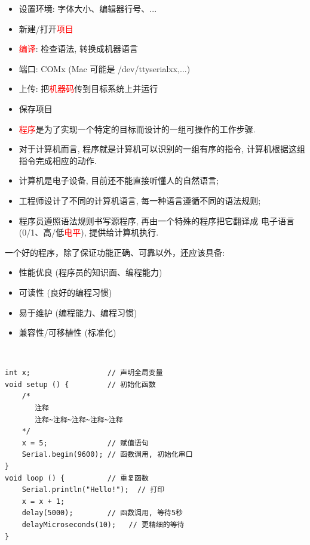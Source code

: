 \documentclass[a4paper,11pt]{seminar}
\newcommand{\alert}[1]{\textcolor{red}{#1}}
\begin{document}
\begin{itemize}
    \item 设置环境: 字体大小、编辑器行号、...
    \item 新建/打开\alert{项目}
    \item \alert{编译}: 检查语法, 转换成机器语言
    \item 端口: COMx (Mac 可能是  /dev/ttyserialxx,...)
    \item 上传: 把\alert{机器码}传到目标系统上并运行
    \item 保存项目
\end{itemize}
\endslide

\begin{itemize}
    \item \alert{程序}是为了实现一个特定的目标而设计的一组可操作的工作步骤.
    \item 对于计算机而言, 程序就是计算机可以识别的一组有序的指令, 
        计算机根据这组指令完成相应的动作.
    \item 计算机是电子设备, 目前还不能直接听懂人的自然语言;
    \item 工程师设计了不同的计算机语言, 每一种语言遵循不同的语法规则;
    \item 程序员遵照语法规则书写源程序, 再由一个特殊的程序把它翻译成
        电子语言 (0/1、高/低\alert{电平}), 提供给计算机执行.
\end{itemize}
\endslide

一个好的程序，除了保证功能正确、可靠以外，还应该具备:
\begin{itemize}
    \item 性能优良 (程序员的知识面、编程能力)
    \item 可读性  (良好的编程习惯)
    \item 易于维护 (编程能力、编程习惯)
    \item 兼容性/可移植性 (标准化)
\end{itemize}
\endslide


~\ \vskip-6mm
\begin{lstlisting}
int x;                  // 声明全局变量
void setup () {         // 初始化函数
    /*
       注释
       注释~注释~注释~注释~注释
    */
    x = 5;              // 赋值语句
    Serial.begin(9600); // 函数调用, 初始化串口
}
void loop () {          // 重复函数
    Serial.println("Hello!");  // 打印
    x = x + 1;
    delay(5000);        // 函数调用, 等待5秒
    delayMicroseconds(10);   // 更精细的等待
}
\end{lstlisting}
\endslide
\end{document}
